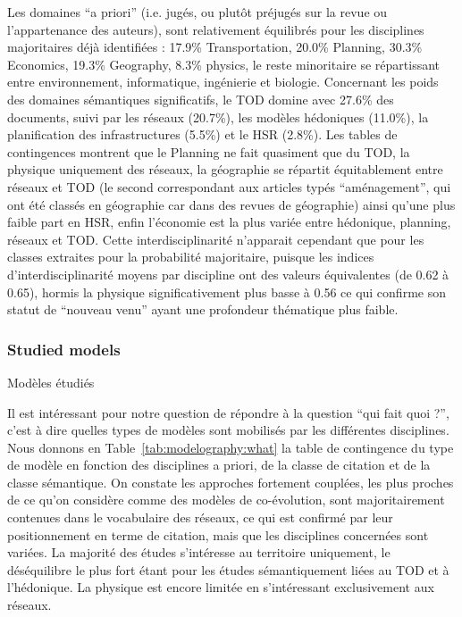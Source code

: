 Les domaines ``a priori'' (i.e. jugés, ou plutôt préjugés sur la revue ou l'appartenance des auteurs), sont relativement équilibrés pour les disciplines majoritaires déjà identifiées : 17.9\% Transportation, 20.0\% Planning, 30.3\% Economics, 19.3\% Geography, 8.3\% physics, le reste minoritaire se répartissant entre environnement, informatique, ingénierie et biologie. Concernant les poids des domaines sémantiques significatifs, le TOD domine avec 27.6\% des documents, suivi par les réseaux (20.7\%), les modèles hédoniques (11.0\%), la planification des infrastructures (5.5\%) et le HSR (2.8\%). Les tables de contingences montrent que le Planning ne fait quasiment que du TOD, la physique uniquement des réseaux, la géographie se répartit équitablement entre réseaux et TOD (le second correspondant aux articles typés ``aménagement'', qui ont été classés en géographie car dans des revues de géographie) ainsi qu'une plus faible part en HSR, enfin l'économie est la plus variée entre hédonique, planning, réseaux et TOD. Cette interdisciplinarité n'apparait cependant que pour les classes extraites pour la probabilité majoritaire, puisque les indices d'interdisciplinarité moyens par discipline ont des valeurs équivalentes (de 0.62 à 0.65), hormis la physique significativement plus basse à 0.56 ce qui confirme son statut de ``nouveau venu'' ayant une profondeur thématique plus faible.


\subsubsection{Studied models}{Modèles étudiés}

Il est intéressant pour notre question de répondre à la question ``qui fait quoi ?'', c'est à dire quelles types de modèles sont mobilisés par les différentes disciplines. Nous donnons en Table~\ref{tab:modelography:what} la table de contingence du type de modèle en fonction des disciplines a priori, de la classe de citation et de la classe sémantique. On constate les approches fortement couplées, les plus proches de ce qu'on considère comme des modèles de co-évolution, sont majoritairement contenues dans le vocabulaire des réseaux, ce qui est confirmé par leur positionnement en terme de citation, mais que les disciplines concernées sont variées. La majorité des études s'intéresse au territoire uniquement, le déséquilibre le plus fort étant pour les études sémantiquement liées au TOD et à l'hédonique. La physique est encore limitée en s'intéressant exclusivement aux réseaux. 


